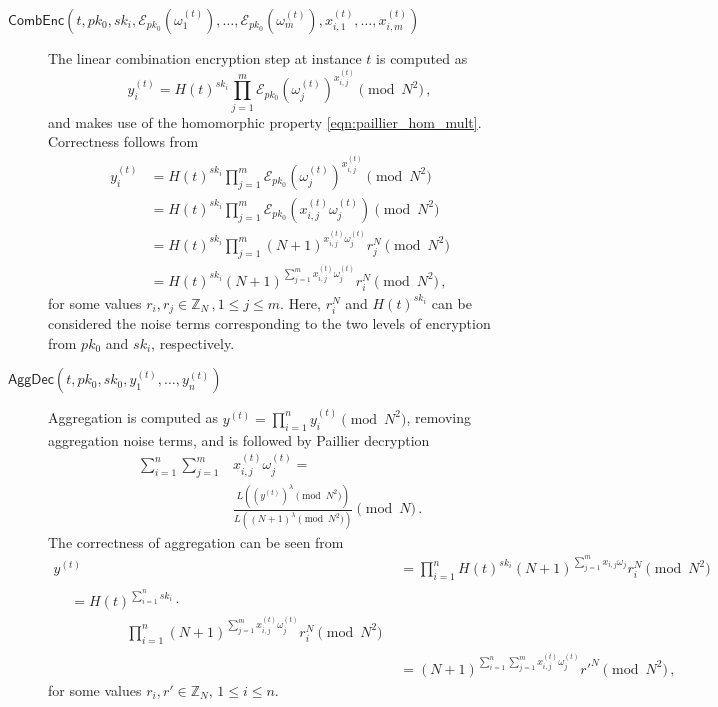 \documentclass[twocolumn]{autart}
\begin{document}
\begin{description}
    \item[$\mathsf{CombEnc}(t, pk_0, sk_i, \mathcal{E}_{pk_0}(\omega_1^{(t)}),\dots,\mathcal{E}_{pk_0}(\omega_m^{(t)}), x^{(t)}_{i,1},\dots,x^{(t)}_{i,m})$] The linear combination encryption step at instance $t$ is computed as 
    \begin{equation}
        y^{(t)}_i = H(t)^{sk_i}\prod^{m}_{j=1}\mathcal{E}_{pk_0}(\omega^{(t)}_j)^{x^{(t)}_{i,j}} \pmod{N^2}\,,\label{eqn:our_scheme_lin_comb}
    \end{equation}
    and makes use of the homomorphic property \eqref{eqn:paillier_hom_mult}. Correctness follows from
    \begin{equation*}
        \begin{split}
             y^{(t)}_i &= H(t)^{sk_i}\prod^{m}_{j=1}\mathcal{E}_{pk_0}(\omega^{(t)}_j)^{x^{(t)}_{i,j}} \pmod{N^2} \\
            &= H(t)^{sk_i}\prod^{m}_{j=1}\mathcal{E}_{pk_0}(x^{(t)}_{i,j}\omega^{(t)}_j) \pmod{N^2} \\
            &= H(t)^{sk_i}\prod^{m}_{j=1}(N+1)^{x^{(t)}_{i,j}\omega^{(t)}_j} r^{N}_{j} \pmod{N^2} \\
            &= H(t)^{sk_i}(N+1)^{\sum^{m}_{j=1}x^{(t)}_{i,j}\omega^{(t)}_j} r_{i}^{N} \pmod{N^2}\,,
        \end{split}
    \end{equation*}
    for some values $r_i,r_j \in \mathbb{Z}_N\,,1\leq j \leq m$. Here, $r_i^N$ and $H(t)^{sk_i}$ can be considered the noise terms corresponding to the two levels of encryption from $pk_0$ and $sk_i$, respectively.

    \item[$\mathsf{AggDec}(t, pk_0, sk_0, y^{(t)}_1,\dots,y^{(t)}_n)$] Aggregation is computed as $y^{(t)} = \prod^n_{i=1}y^{(t)}_i \pmod{N^2}$, removing aggregation noise terms, and is followed by Paillier decryption
    \begin{equation}
        \begin{split}
            \sum^{n}_{i=1}\sum^{m}_{j=1}&x^{(t)}_{i,j}\omega^{(t)}_j =\\
            &\frac{L((y^{(t)})^\lambda\pmod{N^2})}{L((N+1)^\lambda\pmod{N^2})} \pmod{N}\,.
        \end{split} \label{eqn:our_scheme_decrypt}
    \end{equation}
    The correctness of aggregation can be seen from
    \begin{align*}
        y^{(t)} &= \prod^n_{i=1}H(t)^{sk_i}(N+1)^{\sum^{m}_{j=1}x_{i,j}\omega_j}r_i^N \pmod{N^2} \\
        \begin{split}
            &= H(t)^{\sum^n_{i=1}sk_i}\cdot \\
            &\qquad\qquad \prod^n_{i=1}(N+1)^{\sum^{m}_{j=1}x^{(t)}_{i,j}\omega^{(t)}_j}r_i^N \pmod{N^2}
        \end{split}\\
        &= (N+1)^{\sum^n_{i=1}\sum^{m}_{j=1}x^{(t)}_{i,j}\omega^{(t)}_j}r'^N \pmod{N^2}\,,
    \end{align*}
    for some values $r_i,r' \in \mathbb{Z}_N,\,1\leq i \leq n$.
\end{description}
\end{document}
